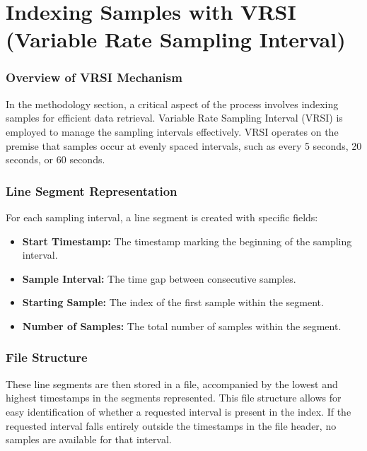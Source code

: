 \documentclass[conference]{IEEEtran}
\begin{document}
\section{Indexing Samples with VRSI (Variable Rate Sampling Interval)}
\vspace{5pt}
\subsubsection{Overview of VRSI Mechanism}

In the methodology section, a critical aspect of the process involves indexing samples for efficient data retrieval. Variable Rate Sampling Interval (VRSI) is employed to manage the sampling intervals effectively. VRSI operates on the premise that samples occur at evenly spaced intervals, such as every 5 seconds, 20 seconds, or 60 seconds.
\vspace{5pt}
\subsubsection{Line Segment Representation}

For each sampling interval, a line segment is created with specific fields:

\begin{itemize}
    \item \textbf{Start Timestamp:} The timestamp marking the beginning of the sampling interval.
    \item \textbf{Sample Interval:} The time gap between consecutive samples.
    \item \textbf{Starting Sample:} The index of the first sample within the segment.
    \item \textbf{Number of Samples:} The total number of samples within the segment.
\end{itemize}
\vspace{5pt}
\subsubsection{File Structure}

These line segments are then stored in a file, accompanied by the lowest and highest timestamps in the segments represented. This file structure allows for easy identification of whether a requested interval is present in the index. If the requested interval falls entirely outside the timestamps in the file header, no samples are available for that interval.
\vspace{5pt}
\end{document}
